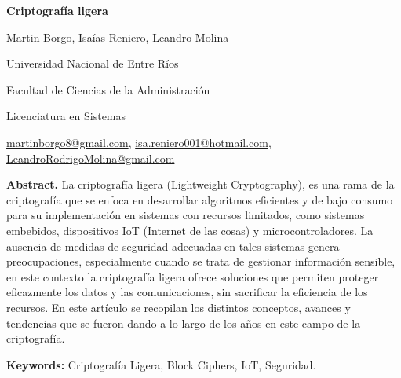 \documentclass[a4paper,10pt]{article}
\begin{document}
	\pagestyle{empty}
	\begin{titlepage}
		\centering
		\vspace*{1.5cm}
		{\fontsize{14}{17}\bfseries Criptografía ligera\par}
		{\small Martin Borgo, Isaías Reniero, Leandro Molina\par}
		{\normalsize Universidad Nacional de Entre Ríos\par}
		{\normalsize Facultad de Ciencias de la Administración\par}
		{\normalsize Licenciatura en Sistemas\par}
		{\small \href{mailto:martinborgo8@gmail.com}{martinborgo8@gmail.com}, \href{mailto:isa.reniero001@hotmail.com}{isa.reniero001@hotmail.com}, \href{mailto:LeandroRodrigoMolina@gmail.com}{LeandroRodrigoMolina@gmail.com}\par}
		{\small \justify\textbf{Abstract.} La criptografía ligera (Lightweight Cryptography), es una rama de la criptografía que se enfoca en desarrollar algoritmos eficientes y de bajo consumo para su implementación en sistemas con recursos limitados, como sistemas embebidos, dispositivos IoT (Internet de las cosas) y microcontroladores. La ausencia de medidas de seguridad adecuadas en tales sistemas genera preocupaciones, especialmente cuando se trata de gestionar información sensible, en este contexto la criptografía ligera ofrece soluciones que permiten proteger eficazmente los datos y las comunicaciones, sin sacrificar la eficiencia de los recursos. En este artículo se recopilan los distintos conceptos, avances y tendencias que se fueron dando a lo largo de los años en este campo de la criptografía.\par}
		
		{\small \justify\textbf{Keywords:} Criptografía Ligera, Block Ciphers, IoT, Seguridad. \par}
	\end{titlepage}
	
\end{document}
